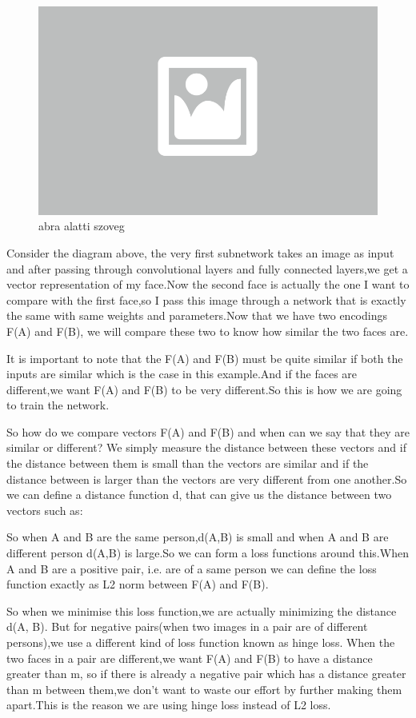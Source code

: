 \begin{figure}[ht]
	\centering
	\includegraphics[width=0.65\columnwidth]{figures/abra.png}
	\caption{abra alatti szoveg}
\end{figure}

Consider the diagram above, the very first subnetwork takes an image as input and after passing through convolutional layers and fully connected layers,we get a vector representation of my face.Now the second face is actually the one I want to compare with the first face,so I pass this image through a network that is exactly the same with same weights and parameters.Now that we have two encodings F(A) and F(B), we will compare these two to know how similar the two faces are.

It is important to note that the F(A) and F(B) must be quite similar if both the inputs are similar which is the case in this example.And if the faces are different,we want F(A) and F(B) to be very different.So this is how we are going to train the network.

So how do we compare vectors F(A) and F(B) and when can we say that they are similar or different? We simply measure the distance between these vectors and if the distance between them is small than the vectors are similar and if the distance between is larger than the vectors are very different from one another.So we can define a distance function d, that can give us the distance between two vectors such as:


So when A and B are the same person,d(A,B) is small and when A and B are different person d(A,B) is large.So we can form a loss functions around this.When A and B are a positive pair, i.e. are of a same person we can define the loss function exactly as L2 norm between F(A) and F(B).


So when we minimise this loss function,we are actually minimizing the distance d(A, B). But for negative pairs(when two images in a pair are of different persons),we use a different kind of loss function known as hinge loss. When the two faces in a pair are different,we want F(A) and F(B) to have a distance greater than m, so if there is already a negative pair which has a distance greater than m between them,we don’t want to waste our effort by further making them apart.This is the reason we are using hinge loss instead of L2 loss.

